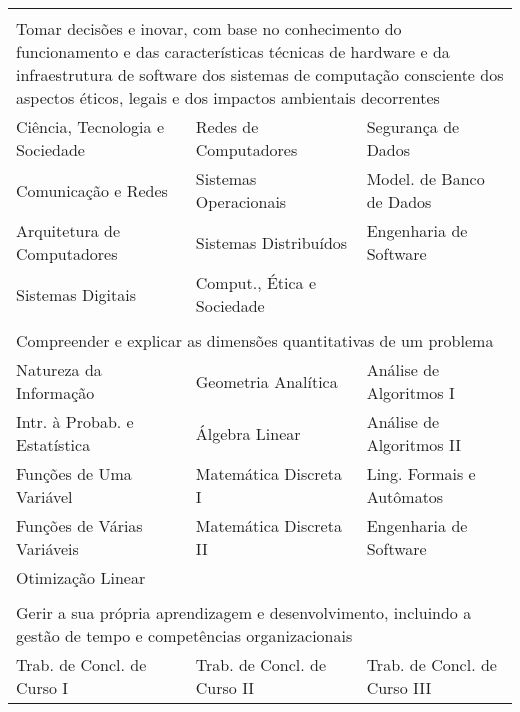 \begin{longtable}{|p{}p{}p{}|}
    \multicolumn{3}{p{0.95\textwidth}}{}\\

    \multicolumn{3}{p{0.95\textwidth}}{Tomar decisões e inovar, com base no
    conhecimento do funcionamento e das características técnicas de hardware
    e da infraestrutura de software dos sistemas de computação consciente dos
    aspectos éticos, legais e dos impactos ambientais decorrentes}\\
    \hline
    \textcolor{nred}{Ciência, Tecnologia e Sociedade} &
    \textcolor{nblue}{Redes de Computadores} &
    \textcolor{nblue}{Segurança de Dados}\\
    \textcolor{nred}{Comunicação e Redes} &
    \textcolor{nblue}{Sistemas Operacionais} &
    \textcolor{nblue}{\small Model. de Banco de Dados}\\
    \textcolor{nblue}{Arquitetura de Computadores} &
    \textcolor{nblue}{Sistemas Distribuídos} &
    \textcolor{nblue}{Engenharia de Software} \\
    \textcolor{nblue}{Sistemas Digitais} &
    \textcolor{nblue}{Comput., Ética e Sociedade} & \\
    \hline
    
    \multicolumn{3}{p{0.95\textwidth}}{}\\
    \multicolumn{3}{p{0.95\textwidth}}{Compreender e explicar as dimensões quantitativas de um
    problema}\\
    \hline
    \textcolor{nred}{Natureza da Informação} &
    \textcolor{nred}{Geometria Analítica} &
    \textcolor{nblue}{Análise de Algoritmos I} \\
    \textcolor{nred}{Intr. à Probab. e Estatística} &
    \textcolor{nblue}{Álgebra Linear} &
    \textcolor{nblue}{Análise de Algoritmos II} \\
    \textcolor{nred}{Funções de Uma Variável} &
    \textcolor{nblue}{Matemática Discreta I} &
    \textcolor{nblue}{Ling. Formais e Autômatos} \\
    \textcolor{nred}{Funções de Várias Variáveis} &
    \textcolor{nblue}{Matemática Discreta II} &
    \textcolor{nblue}{Engenharia de Software}\\
    \textcolor{nblue}{Otimização Linear} & & \\
    \hline
    
    \multicolumn{3}{p{0.95\textwidth}}{}\\
    \multicolumn{3}{p{0.95\textwidth}}{Gerir a sua própria aprendizagem e
    desenvolvimento, incluindo a gestão de tempo e competências
    organizacionais}\\
    \hline
    \textcolor{nblue}{Trab. de Concl. de Curso I} &
    \textcolor{nblue}{Trab. de Concl. de Curso II} &
    \textcolor{nblue}{Trab. de Concl. de Curso III} \\
    \hline
    

\end{longtable}
